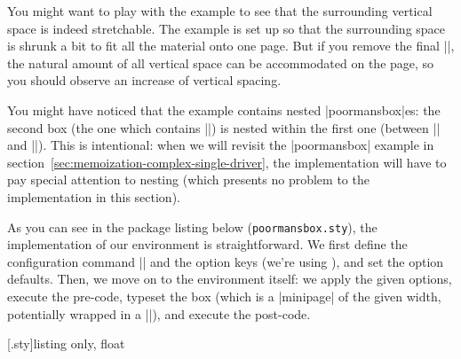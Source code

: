 \documentclass[a4paper,11pt]{article}
\begin{document}

You might want to play with the example to see that the surrounding vertical
space is indeed stretchable.  The example is set up so that the surrounding
space is shrunk a bit to fit all the material onto one page.  But if you remove
the final |\lipsum[144]|, the natural amount of all vertical space can be
accommodated on the page, so you should observe an increase of vertical
spacing.

You might have noticed that the example contains nested |poormansbox|es: the
second box (the one which contains |\lipsum[66]|) is nested within the first
one (between |\lipsum[101]| and |\lipsum[75]|).  This is intentional: when we
will revisit the |poormansbox| example in
section~\ref{sec:memoization-complex-single-driver}, the implementation will
have to pay special attention to nesting (which presents no problem to the
implementation in this section).

As you can see in the package listing below (\texttt{poormansbox.sty}), the
implementation of our environment is straightforward.  We first define the
configuration command |\pmbset| and the option keys (we're using
), and set the option defaults.  Then, we move on to the
environment itself: we apply the given options, execute the pre-code, typeset
the box (which is a |minipage| of the given width, potentially wrapped in a
|\fbox|), and execute the post-code.

[.sty]{listing only, float}
\end{document}
